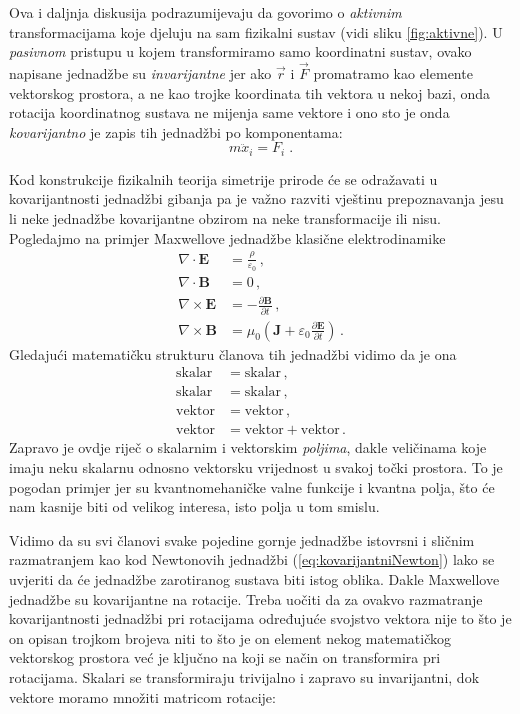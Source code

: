 Ova i daljnja diskusija podrazumijevaju da govorimo o \emph{aktivnim}
transformacijama koje djeluju na sam fizikalni sustav (vidi
sliku \ref{fig:aktivne}). U \emph{pasivnom}
pristupu u kojem transformiramo samo koordinatni sustav,
ovako napisane jednadžbe su \emph{invarijantne} jer
ako $\vec{r}$ i $\vec{F}$ promatramo kao elemente vektorskog prostora,
a ne kao trojke koordinata tih vektora u nekoj bazi, onda rotacija
koordinatnog sustava ne mijenja same vektore i ono sto je onda
\emph{kovarijantno} je zapis tih jednadžbi po komponentama:
\begin{equation}
       m  \ddot{x}_{i} =  F_{i} \;.
\end{equation}

Kod konstrukcije fizikalnih teorija simetrije prirode će se odražavati
u kovarijantnosti jednadžbi gibanja pa je
važno razviti vještinu prepoznavanja jesu li neke jednadžbe
kovarijantne obzirom na neke transformacije ili nisu. Pogledajmo na primjer
Maxwellove jednadžbe klasične elektrodinamike
\begin{align}
    \nabla \cdot \mathbf{E}  &= \frac{\rho}{\varepsilon_0} \,, \label{eq:maxwell1} \\
\nabla \cdot \mathbf{B}  &= 0 \,, \\
\nabla \times \mathbf{E} &= -\frac{\partial \mathbf{B}}{\partial t}  \,,\\
\nabla \times \mathbf{B} &= \mu_0 \left(\mathbf{J} + 
    \varepsilon_0  \frac{\partial \mathbf{E}}{\partial t} \right) \,. \label{eq:maxwell4}
\end{align}
Gledajući matematičku strukturu članova tih jednadžbi vidimo da je ona
\begin{align*}
    \text{skalar} &= \text{skalar} \,, \\
    \text{skalar} &= \text{skalar}  \,,\\
    \text{vektor} &= \text{vektor}  \,,\\
    \text{vektor} &= \text{vektor} + \text{vektor} \,.
\end{align*}
Zapravo je ovdje riječ o skalarnim i vektorskim \emph{poljima}, dakle veličinama
koje imaju neku skalarnu odnosno vektorsku vrijednost u svakoj točki prostora.
To je pogodan primjer jer su kvantnomehaničke valne funkcije
i kvantna polja, što će nam kasnije biti od velikog interesa, isto polja u tom smislu.

Vidimo da su svi članovi svake pojedine gornje jednadžbe istovrsni i sličnim
razmatranjem kao kod
Newtonovih jednadžbi (\ref{eq:kovarijantniNewton}) lako se uvjeriti da
će jednadžbe zarotiranog
sustava biti istog oblika. Dakle Maxwellove jednadžbe su kovarijantne
na rotacije.
Treba uočiti da za ovakvo razmatranje kovarijantnosti jednadžbi pri rotacijama određujuće svojstvo 
vektora nije to što je on opisan trojkom brojeva niti
to što je on element nekog matematičkog vektorskog prostora već je ključno na koji
se način on transformira pri rotacijama. Skalari se transformiraju trivijalno i
zapravo su invarijantni, dok vektore moramo množiti matricom rotacije:

